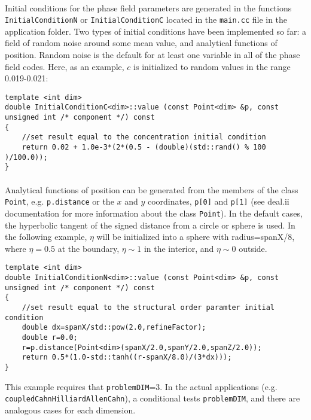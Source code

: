 \documentclass[11pt]{article}
\begin{document}
\paragraph{}
Initial conditions for the phase field parameters are generated in the functions \\ \texttt{InitialConditionN} or \texttt{InitialConditionC} located in the \texttt{main.cc} file in the application folder.  Two types of initial conditions have been implemented so far: a field of random noise around some mean value, and analytical functions of position.  Random noise is the default for at least one variable in all of the phase field codes.  Here, as an example, $c$ is initialized to random values in the range 0.019-0.021:
\begin{lstlisting}
template <int dim>
double InitialConditionC<dim>::value (const Point<dim> &p, const unsigned int /* component */) const
{
	//set result equal to the concentration initial condition
	return 0.02 + 1.0e-3*(2*(0.5 - (double)(std::rand() % 100 )/100.0));
}
\end{lstlisting}
\paragraph{}
Analytical functions of position can be generated from the members of the class \texttt{Point}, e.g. \texttt{p.distance} or the $x$ and $y$ coordinates, \texttt{p[0]} and \texttt{p[1]} (see deal.ii documentation for more information about the class \texttt{Point}).  In the default cases,  the hyperbolic tangent of the signed distance from a circle or sphere is used.  In the following example, $\eta$ will be initialized into a sphere with radius=spanX/8, where $\eta=0.5$ at the boundary, $\eta \sim 1$ in the interior, and $\eta \sim 0$ outside.
\begin{lstlisting}
template <int dim>
double InitialConditionN<dim>::value (const Point<dim> &p, const unsigned int /* component */) const
{
	//set result equal to the structural order paramter initial condition
	double dx=spanX/std::pow(2.0,refineFactor);
	double r=0.0;
	r=p.distance(Point<dim>(spanX/2.0,spanY/2.0,spanZ/2.0));
	return 0.5*(1.0-std::tanh((r-spanX/8.0)/(3*dx)));
}
\end{lstlisting}
This example requires that \texttt{problemDIM}=3.  In the actual applications (e.g. \\\texttt{coupledCahnHilliardAllenCahn}), a conditional tests  \texttt{problemDIM}, and there are analogous cases for each dimension.
\end{document}
